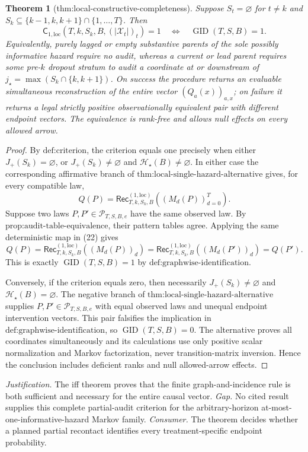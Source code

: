 \documentclass{article}
\newtheorem{theorem}{Theorem}
\begin{document}
\begin{theorem}[thm:local-constructive-completeness]\label{thm:local-constructive-completeness}
Suppose \(S_t=\varnothing\) for \(t\ne k\) and
\(S_k\subseteq\{k-1,k,k+1\}\cap\{1,\ldots,T\}\).  Then
\[
\mathsf C_{1,\mathrm{loc}}(T,k,S_k,B,(|\mathcal X_t|)_t)=1
\quad\Longleftrightarrow\quad
\operatorname{GID}(T,S,B)=1.
\]
Equivalently, purely lagged or empty substantive parents of the sole possibly informative hazard require no audit, whereas a current or lead parent requires some pre-\(k\) dropout stratum to audit a coordinate at or downstream of \(j_\star=\max(S_k\cap\{k,k+1\})\).  On success the procedure returns an evaluable simultaneous reconstruction of the entire vector \((Q_a(x))_{a,x}\); on failure it returns a legal strictly positive observationally equivalent pair with different endpoint vectors.  The equivalence is rank-free and allows null effects on every allowed arrow.
\end{theorem}
\begin{proof}
By \(\text{def:criterion}\), the criterion equals one precisely when either
\(J_+(S_k)=\varnothing\), or \(J_+(S_k)\ne\varnothing\) and
\(\mathcal H_\star(B)\ne\varnothing\).  In either case the corresponding affirmative branch of \(\text{thm:local-single-hazard-alternative}\) gives, for every compatible law,
\[
Q(P)=\mathsf{Rec}^{(1,\mathrm{loc})}_{T,k,S_k,B}((M_d(P))_{d=0}^T).
\tag{22}
\]
Suppose two laws \(P,P'\in\mathcal P_{T,S,B,e}\) have the same observed law.  By \(\text{prop:audit-table-equivalence}\), their pattern tables agree.  Applying the same deterministic map in (22) gives
\[
Q(P)=\mathsf{Rec}^{(1,\mathrm{loc})}_{T,k,S_k,B}((M_d(P))_d)
=\mathsf{Rec}^{(1,\mathrm{loc})}_{T,k,S_k,B}((M_d(P'))_d)=Q(P').
\]
This is exactly \(\operatorname{GID}(T,S,B)=1\) by
\(\text{def:graphwise-identification}\).

Conversely, if the criterion equals zero, then necessarily
\(J_+(S_k)\ne\varnothing\) and \(\mathcal H_\star(B)=\varnothing\).  The negative branch of \(\text{thm:local-single-hazard-alternative}\) supplies
\(P,P'\in\mathcal P_{T,S,B,e}\) with equal observed laws and unequal endpoint intervention vectors.  This pair falsifies the implication in
\(\text{def:graphwise-identification}\), so \(\operatorname{GID}(T,S,B)=0\).  The alternative proves all coordinates simultaneously and its calculations use only positive scalar normalization and Markov factorization, never transition-matrix inversion.  Hence the conclusion includes deficient ranks and null allowed-arrow effects.
\end{proof}
\par\smallskip\noindent \textit{Justification.} The iff theorem proves that the finite graph-and-incidence rule is both sufficient and necessary for the entire causal vector. \textit{Gap.} No cited result supplies this complete partial-audit criterion for the arbitrary-horizon at-most-one-informative-hazard Markov family. \textit{Consumer.} The theorem decides whether a planned partial recontact identifies every treatment-specific endpoint probability.
\end{document}
